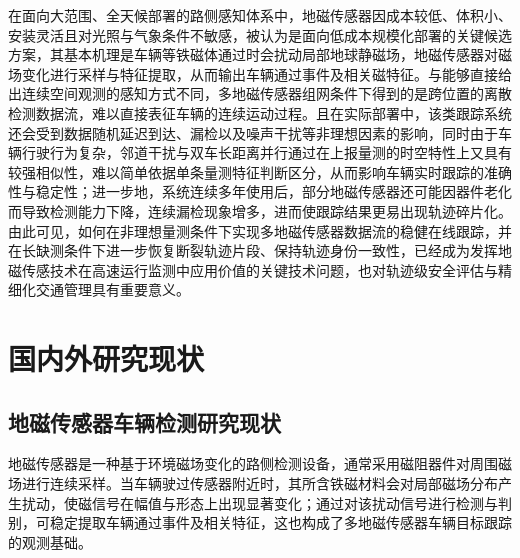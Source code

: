 \documentclass{xdupgthesis}
\begin{document}
在面向大范围、全天候部署的路侧感知体系中，地磁传感器因成本较低、体积小、安装灵活且对光照与气象条件不敏感，被认为是面向低成本规模化部署的关键候选方案，其基本机理是车辆等铁磁体通过时会扰动局部地球静磁场，地磁传感器对磁场变化进行采样与特征提取，从而输出车辆通过事件及相关磁特征\cite{culik2023wirelessmagnetic}。与能够直接给出连续空间观测的感知方式不同，多地磁传感器组网条件下得到的是跨位置的离散检测数据流，难以直接表征车辆的连续运动过程。且在实际部署中，该类跟踪系统还会受到数据随机延迟到达、漏检以及噪声干扰等非理想因素的影响，同时由于车辆行驶行为复杂，邻道干扰与双车长距离并行通过在上报量测的时空特性上又具有较强相似性，难以简单依据单条量测特征判断区分，从而影响车辆实时跟踪的准确性与稳定性；进一步地，系统连续多年使用后，部分地磁传感器还可能因器件老化而导致检测能力下降，连续漏检现象增多，进而使跟踪结果更易出现轨迹碎片化\cite{rakai2022dataassociation,feng2021magneticdataassociation,wang2023distributedmagnetic}。由此可见，如何在非理想量测条件下实现多地磁传感器数据流的稳健在线跟踪，并在长缺测条件下进一步恢复断裂轨迹片段、保持轨迹身份一致性，已经成为发挥地磁传感技术在高速运行监测中应用价值的关键技术问题，也对轨迹级安全评估与精细化交通管理具有重要意义。

\section{国内外研究现状}

\subsection{地磁传感器车辆检测研究现状}
地磁传感器是一种基于环境磁场变化的路侧检测设备，通常采用磁阻器件对周围磁场进行连续采样。当车辆驶过传感器附近时，其所含铁磁材料会对局部磁场分布产生扰动，使磁信号在幅值与形态上出现显著变化；通过对该扰动信号进行检测与判别，可稳定提取车辆通过事件及相关特征，这也构成了多地磁传感器车辆目标跟踪的观测基础\cite{balid2018intelligent,feng2022magmonitor}。
\end{document}
